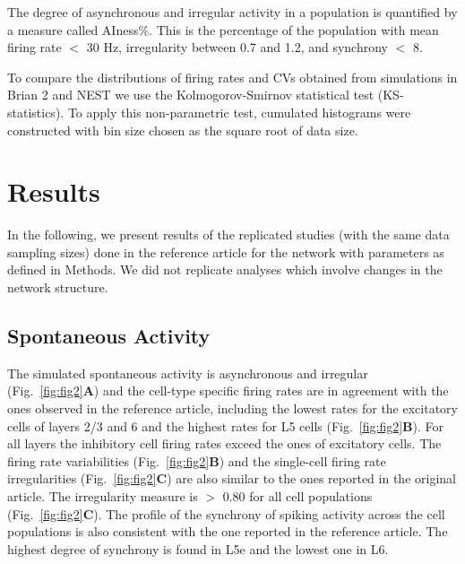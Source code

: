 \documentclass[10pt,a4paper,onecolumn]{article}
\begin{document}
The degree of asynchronous and irregular activity in a population is quantified by a measure called AIness\%. This is the percentage of the population with mean firing rate $<$ 30 Hz, irregularity between 0.7 and 1.2, and synchrony $<$ 8. 

To compare the distributions of firing rates and CVs obtained from simulations in Brian 2 and NEST we use the Kolmogorov-Smirnov statistical test (KS-statistics). To apply this non-parametric test, cumulated histograms were constructed with bin size chosen as the square root of data size.

\section{Results}\label{results}

In the following, we present results of the replicated studies (with the same data sampling sizes) done in the reference article for the network with parameters as defined in Methods. We did not replicate analyses which involve changes in the network structure.

\subsection{Spontaneous Activity}
The simulated spontaneous activity is asynchronous and irregular (Fig.~\ref{fig:fig2}\textbf{A}) and the cell-type specific firing rates are in agreement with the ones observed in the reference article, including the lowest rates for the excitatory cells of layers 2/3 and 6 and the highest rates for L5 cells (Fig.~\ref{fig:fig2}\textbf{B}). For all layers the inhibitory cell firing rates exceed the ones of excitatory cells. The firing rate variabilities (Fig.~\ref{fig:fig2}\textbf{B}) and the single-cell firing rate irregularities (Fig.~\ref{fig:fig2}\textbf{C}) are also similar to the ones reported in the original article. The irregularity measure is $>$ 0.80 for all cell populations (Fig.~\ref{fig:fig2}\textbf{C}). The profile of the synchrony of spiking activity across the cell populations is also consistent with the one reported in the reference article. The highest degree of synchrony is found in L5e and the lowest one in L6. 
\end{document}
